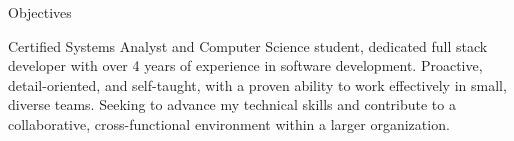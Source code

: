 \begin{rubric}{Objectives}

\entry*Certified Systems Analyst and Computer Science student, dedicated full stack developer with over 4 years of experience in software development. Proactive, detail-oriented, and self-taught, with a proven ability to work effectively in small, diverse teams. Seeking to advance my technical skills and contribute to a collaborative, cross-functional environment within a larger organization.
\end{rubric}